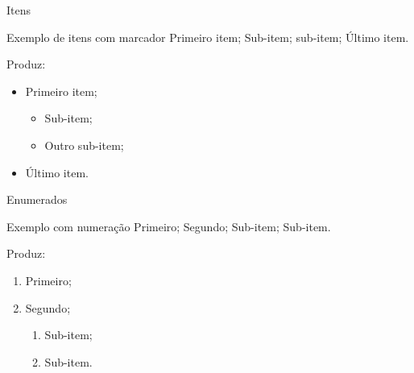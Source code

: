 

\begin{frame}{Itens}
	\begin{Codigo}{Exemplo de itens com marcador}
		 \n
			 Primeiro item; \n
				 \n
					 Sub-item; \n
					 sub-item; \n
				 \n
			 Último item. \n
	\end{Codigo}

	\pause
	Produz:
	
		\begin{Resultado}{}
			\begin{itemize}
			\item Primeiro item;
				\begin{itemize}
					\item Sub-item;
					\item Outro sub-item;
				\end{itemize}
			\item Último item.
			\end{itemize}
		\end{Resultado}
\end{frame}

\begin{frame}{Enumerados}
	\begin{Codigo}{Exemplo com numeração}
		\n
			 Primeiro;\n
			 Segundo; \n
				 \n
					 Sub-item; \n
					 Sub-item. \n
			 \n
	\end{Codigo}

\pause
	Produz:

	\begin{Resultado}{}
		\begin{enumerate}
			\item Primeiro;
			\item Segundo;
				\begin{enumerate}
					\item Sub-item;
					\item Sub-item.
				\end{enumerate}
		\end{enumerate}
	\end{Resultado}
\end{frame}

